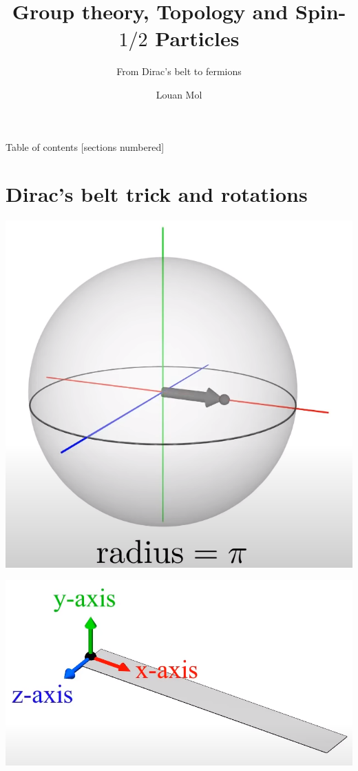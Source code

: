 \documentclass[10pt]{beamer}
\title{Group theory, Topology and Spin-$1/2$ Particles}
\subtitle{From Dirac's belt to fermions}
\date{}
\author{Louan Mol}
\institute{Unversité Libre de Bruxelles\\[2cm]{\small Brussels Summer School of Mathematics 2022}}
\begin{document}
\maketitle

\begin{frame}{Table of contents}
  [sections numbered]
  \tableofcontents%
\end{frame}

\section[Intro]{Dirac's belt trick and rotations}

    \includegraphics[scale=0.1]{Pictures/SO3sphere.png}

    \includegraphics[scale=0.1]{Pictures/beltaxis.png}
\end{document}
